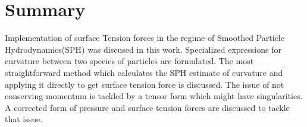 \documentclass[oneside]{iitbreport}
\begin{document}


 

                    

\figurespagefalse
\tablespagefalse
\makecontents %


\cleardoublepage
\setcounter{page}{1}






\chapter{Summary}
Implementation of surface Tension forces in the regime of Smoothed Particle Hydrodynamics(SPH) was discused in this work. Specialized expressions for curvature between two species of particles are formulated. The most straightforward method which calculates the SPH estimate of curvature and applying it directly to get surface tension force is discussed. The issue of not conserving momentum is tackled by a tensor form which might have singularities. A corrected form of pressure and surface tension forces are discussed to tackle that issue.
\end{document}

